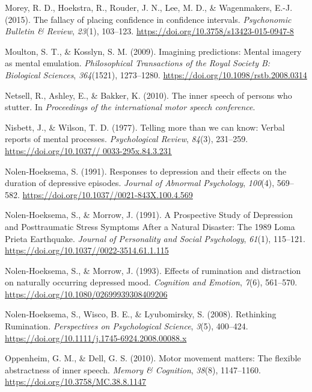 \documentclass[a4paper,12pt,twoside,openright,oldfontcommands]{memoir}
\begin{document}
\hypertarget{ref-morey_fallacy_2015}{}
Morey, R. D., Hoekstra, R., Rouder, J. N., Lee, M. D., \& Wagenmakers,
E.-J. (2015). The fallacy of placing confidence in confidence intervals.
\emph{Psychonomic Bulletin \& Review}, \emph{23}(1), 103--123.
\url{https://doi.org/10.3758/s13423-015-0947-8}

\hypertarget{ref-moulton_imagining_2009}{}
Moulton, S. T., \& Kosslyn, S. M. (2009). Imagining predictions: Mental
imagery as mental emulation. \emph{Philosophical Transactions of the
Royal Society B: Biological Sciences}, \emph{364}(1521), 1273--1280.
\url{https://doi.org/10.1098/rstb.2008.0314}

\hypertarget{ref-netsell_inner_2010}{}
Netsell, R., Ashley, E., \& Bakker, K. (2010). The inner speech of
persons who stutter. In \emph{Proceedings of the international motor
speech conference}.

\hypertarget{ref-nisbett_telling_1977}{}
Nisbett, J., \& Wilson, T. D. (1977). Telling more than we can know:
Verbal reports of mental processes. \emph{Psychological Review},
\emph{84}(3), 231--259.
\href{https://doi.org/10.1037//\%200033-295x.84.3.231}{https://doi.org/10.1037// 0033-295x.84.3.231}

\hypertarget{ref-nolen-hoeksema_responses_1991}{}
Nolen-Hoeksema, S. (1991). Responses to depression and their effects on
the duration of depressive episodes. \emph{Journal of Abnormal
Psychology}, \emph{100}(4), 569--582.
\url{https://doi.org/10.1037//0021-843X.100.4.569}

\hypertarget{ref-nolen-hoeksema_prospective_1991}{}
Nolen-Hoeksema, S., \& Morrow, J. (1991). A Prospective Study of
Depression and Posttraumatic Stress Symptoms After a Natural Disaster:
The 1989 Loma Prieta Earthquake. \emph{Journal of Personality and Social
Psychology}, \emph{61}(1), 115--121.
\url{https://doi.org/10.1037//0022-3514.61.1.115}

\hypertarget{ref-nolen-hoeksema_effects_1993}{}
Nolen-Hoeksema, S., \& Morrow, J. (1993). Effects of rumination and
distraction on naturally occurring depressed mood. \emph{Cognition and
Emotion}, \emph{7}(6), 561--570.
\url{https://doi.org/10.1080/02699939308409206}

\hypertarget{ref-Nolen-Hoeksema2008}{}
Nolen-Hoeksema, S., Wisco, B. E., \& Lyubomirsky, S. (2008). Rethinking
Rumination. \emph{Perspectives on Psychological Science}, \emph{3}(5),
400--424. \url{https://doi.org/10.1111/j.1745-6924.2008.00088.x}

\hypertarget{ref-oppenheim_motor_2010}{}
Oppenheim, G. M., \& Dell, G. S. (2010). Motor movement matters: The
flexible abstractness of inner speech. \emph{Memory \& Cognition},
\emph{38}(8), 1147--1160. \url{https://doi.org/10.3758/MC.38.8.1147}
\end{document}
